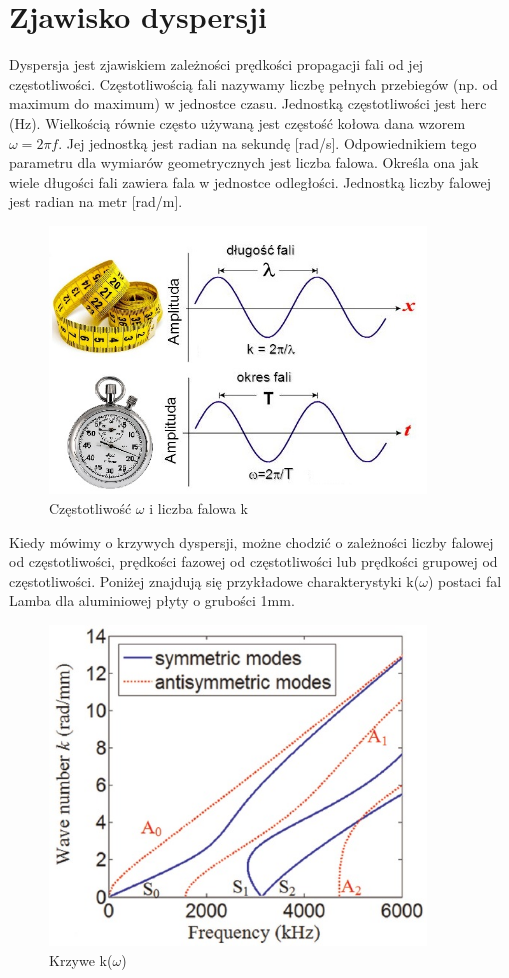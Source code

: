 
\section{Zjawisko dyspersji}
\label{sec:rodzaje_fal_sprezystych}

Dyspersja jest zjawiskiem zależności prędkości propagacji fali od jej częstotliwości. Częstotliwością fali nazywamy liczbę pełnych przebiegów (np. od maximum do maximum) w jednostce czasu. Jednostką częstotliwości jest herc (Hz). Wielkością równie często używaną jest częstość kołowa dana wzorem \( \omega = 2\pi f \). Jej jednostką jest radian na sekundę [rad/s]. Odpowiednikiem tego parametru dla wymiarów geometrycznych jest liczba falowa. Określa ona jak wiele długości fali zawiera fala w jednostce odległości. Jednostką liczby falowej jest radian na metr [rad/m].

\begin{figure}[h]
\centering
\includegraphics[width=10cm]{Zdjecia/2/czestotliwosc1}
\caption{Częstotliwość \( \omega \) i liczba falowa k}
\label{fig:czestotliwosc_i_liczba_falowa}
\end{figure}


Kiedy mówimy o krzywych dyspersji, możne chodzić o zależności liczby falowej od częstotliwości, prędkości fazowej od częstotliwości lub prędkości grupowej od częstotliwości. Poniżej znajdują się przykładowe charakterystyki k(\(\omega\)) postaci fal Lamba dla aluminiowej płyty o grubości 1mm.

\begin{figure}[h]
\centering
\includegraphics[width=10cm]{Zdjecia/2/char_fazowa}
\caption{Krzywe k(\(\omega\))}
\label{fig:krzywe_k_od_omega}
\end{figure}

